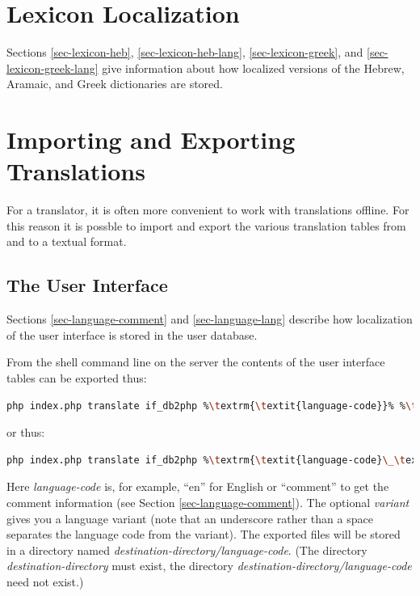 \documentclass[11pt,oneside,a4paper]{memoir}
\begin{document}
\section{Lexicon Localization}\label{sec-lex-loc}

Sections \ref{sec-lexicon-heb}, \ref{sec-lexicon-heb-lang}, \ref{sec-lexicon-greek}, and
\ref{sec-lexicon-greek-lang} give information about how localized versions of the Hebrew, Aramaic,
and Greek dictionaries are stored.


\section{Importing and Exporting Translations}\label{sec-imp-exp-trans}%
%

For a translator, it is often more convenient to work with translations offline. For this reason it
is possble to import and export the various translation tables from and to a textual format.

\subsection{The User Interface}

Sections \ref{sec-language-comment} and \ref{sec-language-lang} describe how localization of the
user interface is stored in the user database.

From the shell command line on the server the contents of the user interface tables can be exported
thus:

\begin{lstlisting}[language=bash,basicstyle={\ttfamily}]
php index.php translate if_db2php %\textrm{\textit{language-code}}% %\textrm{\textit{destination-directory}}%
\end{lstlisting}

\noindent
or thus:

\begin{lstlisting}[language=bash,basicstyle={\ttfamily}]
php index.php translate if_db2php %\textrm{\textit{language-code}\_\textit{variant}}% %\textrm{\textit{destination-directory}}%
\end{lstlisting}


Here \emph{language-code} is, for example, ``en'' for English or ``comment'' to get the comment
information (see Section \ref{sec-language-comment}). The optional \emph{variant} gives you a
language variant (note that an underscore rather than a space separates the language code from the
variant). The exported files will be stored in a directory named
\emph{destination-directory/language-code}. (The directory \emph{destination-directory} must exist,
the directory \emph{destination-directory/language-code} need not exist.)
\end{document}
